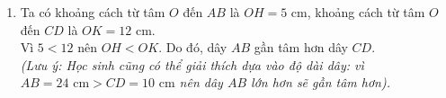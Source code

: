 \begin{bt}
{\begin{enumerate}
			Suy ra $CK = \dfrac{CD}{2} = \dfrac{10}{2} = 5\text{ (cm)}$.\\
			Xét tam giác vuông $OKC$, theo định lí Pythagore ta có:\\
			$OK = \sqrt{OC^2 - CK^2} = \sqrt{13^2 - 5^2} = \sqrt{169 - 25} = \sqrt{144} = 12\text{ (cm)}$.\\
			Vậy khoảng cách từ $O$ đến $AB$ là $5\text{ cm}$, từ $O$ đến $CD$ là $12\text{ cm}$.
			\item Ta có khoảng cách từ tâm $O$ đến $AB$ là $OH = 5\text{ cm}$, khoảng cách từ tâm $O$ đến $CD$ là $OK = 12\text{ cm}$.\\
			Vì $5 < 12$ nên $OH < OK$. Do đó, dây $AB$ gần tâm hơn dây $CD$.\\
			\textit{(Lưu ý: Học sinh cũng có thể giải thích dựa vào độ dài dây: vì $AB = 24\text{ cm} > CD = 10\text{ cm}$ nên dây $AB$ lớn hơn sẽ gần tâm hơn).}
		\end{enumerate}
	}
\end{bt}

